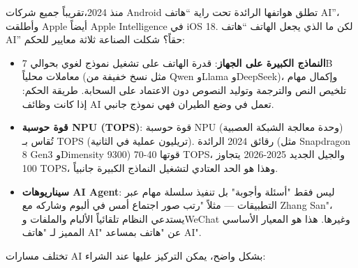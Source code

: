 


منذ 2024،تقريباً جميع شركات Android تطلق هواتفها الرائدة تحت راية “هاتف AI”، وأطلقت Apple أيضاً Apple Intelligence في iOS 18. لكن ما الذي يجعل الهاتف “هاتف AI” حقاً؟ شكلت الصناعة ثلاثة معايير للحكم:

\begin{itemize}
  \item \textbf{النماذج الكبيرة على الجهاز}: قدرة الهاتف على تشغيل نموذج لغوي بحوالي 7B معاملات محلياً (مثل نسخ خفيفة من Qwen وLlama وDeepSeek)، وإكمال مهام تلخيص النص والترجمة وتوليد النصوص دون الاعتماد على السحابة. طريقة الحكم: إذا كانت وظائف AI تعمل في وضع الطيران فهي نموذج جانبي.
  \item \textbf{قوة حوسبة NPU (TOPS)}: قوة حوسبة NPU (وحدة معالجة الشبكة العصبية) تُقاس بـ TOPS (تريليون عملية في الثانية). رقائق 2024 الرائدة (مثل Snapdragon 8 Gen3 وDimensity 9300) قوتها 40-70 TOPS، والجيل الجديد 2025-2026 يتجاوز 100 TOPS، وهذا هو الحد العتادي لتشغيل النماذج الكبيرة جانبياً.
  \item \textbf{سيناريوهات AI Agent}: ليس فقط "أسئلة وأجوبة" بل تنفيذ سلسلة مهام عبر التطبيقات — مثلاً "رتب صور اجتماع أمس في ألبوم وشاركه مع Zhang San"، يستدعي النظام تلقائياً الألبام والملفات وWeChat وغيرها. هذا هو المعيار الأساسي المميز لـ "هاتف AI" عن "هاتف بمساعد AI".
\end{itemize}


تختلف مسارات AI بشكل واضح، يمكن التركيز عليها عند الشراء:

